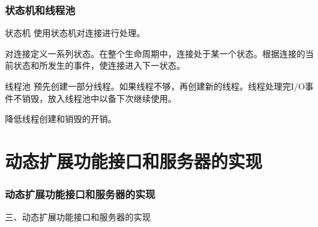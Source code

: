 \documentclass[10pt,dvipdfm]{beamer}
\begin{document}
\begin{frame}
	\frametitle{状态机和线程池}
	\begin{block}{状态机}
	使用状态机对连接进行处理。
	
	对连接定义一系列状态。在整个生命周期中，连接处于某一个状态。根据连接的当前状态和所发生的事件，使连接进入下一状态。
	\end{block}
	\pause
	\begin{block}{线程池}
	预先创建一部分线程。如果线程不够，再创建新的线程。线程处理完I/O事件不销毁，放入线程池中以备下次继续使用。
	
	降低线程创建和销毁的开销。
	\end{block}
\end{frame}

\section{动态扩展功能接口和服务器的实现}

\begin{frame}
	\frametitle{动态扩展功能接口和服务器的实现}
	\begin{center}
	{\Large
		三、动态扩展功能接口和服务器的实现
	}
	\end{center}
\end{frame}

\end{document}
